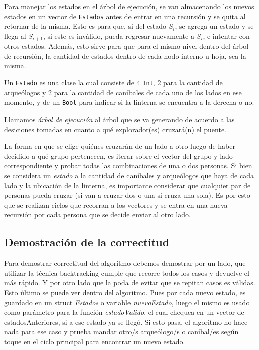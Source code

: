            Para manejar los estados en el árbol de ejecución, se van almacenando los nuevos estados en un vector de \texttt{Estados} antes de entrar en una recursión y se quita al retornar de la misma. Esto es para que, si del estado $S_{i}$, se agrega un estado y se llega al $S_{i+1}$, si este es inválido, pueda regresar nuevamente a $S_{i}$, e intentar con otros estados. Además, esto sirve para que para el mismo nivel dentro del árbol de recursión, la cantidad de estados dentro de cada nodo interno u hoja, sea la misma.

            Un \texttt{Estado} es una clase la cual consiste de 4 \texttt{Int}, 2 para la cantidad de arqueólogos y 2 para la cantidad de caníbales de cada uno de los lados en ese momento, y de un \texttt{Bool} para indicar si la linterna se encuentra a la derecha o no.

            Llamamos \emph{árbol de ejecución} al árbol que se va generando de acuerdo a las desiciones tomadas en cuanto a qué explorador(es) cruzará(n) el puente.

            La forma en que se elige quiénes cruzarán de un lado a otro luego de haber decidido a qué grupo pertenecen, es iterar sobre el vector del grupo y lado correspondiente y probar todas las combinaciones de una o dos personas. Si bien se considera un \emph{estado} a la cantidad de caníbales y arqueólogos que haya de cada lado y la ubicación de la linterna, es importante considerar que cualquier par de personas pueda cruzar (si van a cruzar dos o una si cruza una sola). Es por esto que se realizan ciclos que recorran a los vectores y se entra en una nueva recursión por cada persona que se decide enviar al otro lado.


    \subsection{Demostración de la correctitud}
      Para demostrar correctitud del algoritmo debemos demostrar por un lado, que utilizar la técnica backtracking cumple que recorre todos los casos y devuelve el más rápido. Y por otro lado que la poda de  evitar que se repitan casos es válidas.
      Esto último se puede ver dentro del algoritmo. Pues por cada nuevo estado, es guardado en un struct \emph{Estados} o variable \emph{nuevoEstado}, luego el mismo es usado como parámetro para la función \emph{estadoValido}, el cual chequea en un vector de estadosAnteriores, si a ese estado ya se llegó. Si esto pasa, el algoritmo no hace nada para ese caso y prueba mandar otro/s arqueólogo/s o caníbal/es según toque en el ciclo principal para encontrar un nuevo estado.\par

